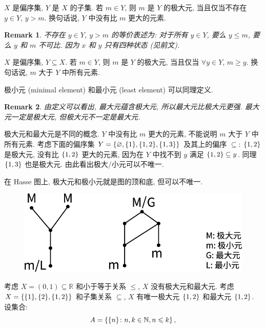 \documentclass[UTF8]{ctexart}
\theoremstyle{mystyle}
\theoremstyle{myremark}
\newtheorem*{remark}{Remark}
\theoremstyle{plain}
\newcommand{\R}{\mathbb R}
\newcommand{\N}{\mathbb N}
\DeclarePairedDelimiter\set{\{}{\}}
\begin{document}
\begin{definition}
    $ X $ 是偏序集, $ Y $ 是 $ X $ 的子集. 若 $ m \in Y $, 则 $ m $ 是 $ Y $ 的极大元, 当且仅当不存在 $ y \in Y $, $ y > m $. 换句话说, $ Y $ 中没有比 $ m $ 更大的元素. 
\end{definition}

\begin{remark}
    不存在 $ y \in Y $, $ y > m $ 的等价表述为: 对于所有 $ y \in Y $, 要么 $ y \le m $, 要么 $ y $ 和 $ m $ 不可比. 因为 $ x $ 和 $ y $ 只有四种状态 (见前文).
\end{remark}

\begin{definition}
    $ X $ 是偏序集, $ Y \subseteq X $. 若 $ m \in Y $, 则 $ m $ 是 $ Y $ 的极大元, 当且仅当 $ \forall y \in Y $, $ m \ge y $. 换句话说, $ m $ 大于 $ Y $ 中所有元素.
\end{definition}

极小元 (minimal element) 和最小元 (least element) 可以同理定义.

\begin{remark}
    由定义可以看出, 最大元蕴含极大元, 所以最大元比极大元更强. 最大元一定是极大元, 但极大元不一定是最大元.
\end{remark}


极大元和最大元是不同的概念. $ Y $ 中没有比 $ m $ 更大的元素, 不能说明 $ m $ 大于 $ Y $ 中所有元素. 考虑下面的偏序集 $ Y = \set{\varnothing, \set{1}, \set{1, 2}, \set{1, 3}} $ 及其上的偏序 $ \subseteq $: $ \set{1, 2} $ 是极大元, 没有比 $ \set{1, 2} $ 更大的元素, 因为在 $ Y $ 中找不到 $ y $ 满足 $ \set{1, 2} \subseteq y $. 同理 $ \set{1, 3} $ 也是极大元. 由此看出极大/小元可以不唯一.

在 Hasse 图上, 极大元和极小元就是图的顶和底, 但可以不唯一. 

\begin{figure}[H]
    \centering
    \includegraphics[width = 0.6\linewidth]{./images/maximal_greatest.png}
\end{figure} 

考虑 $ X = (0, 1) \subseteq \R $ 和小于等于关系 $ \leqslant $, $ X $ 没有极大元和最大元. 考虑 $ X = \set{\set{1}, \set{2}, \set{1, 2}} $ 和子集关系 $ \subseteq $, $ X $ 有唯一极大元 $ \set{1, 2} $ 和最大元 $ \set{1, 2} $. 设集合:
\[ A = \set{\set{n} \colon n, k \in \N, n \leqslant k} \,,\]
\end{document}
